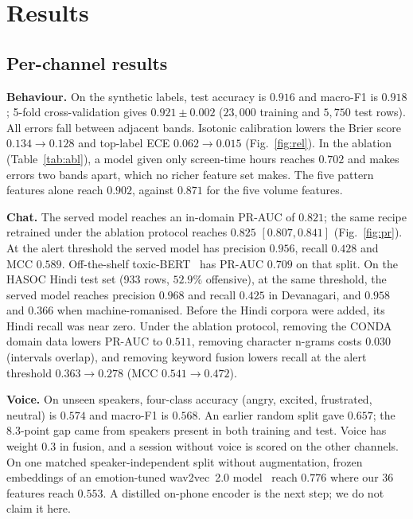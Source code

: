 \documentclass[conference]{IEEEtran}
\begin{document}
\section{Results}
\subsection{Per-channel results}
\textbf{Behaviour.} On the synthetic labels, test accuracy is $0.916$ and macro-F1 is
$0.918$; 5-fold cross-validation gives $0.921\pm0.002$ ($23{,}000$ training and
$5{,}750$ test rows). All errors fall between adjacent bands. Isotonic calibration
lowers the Brier score $0.134\!\rightarrow\!0.128$ and top-label ECE
$0.062\!\rightarrow\!0.015$ (Fig.~\ref{fig:rel}). In the ablation
(Table~\ref{tab:abl}), a model given only screen-time hours reaches $0.702$ and makes
errors two bands apart, which no richer feature set makes. The five pattern features
alone reach $0.902$, against $0.871$ for the five volume features.

\textbf{Chat.} The served model reaches an in-domain PR-AUC of $0.821$; the same recipe
retrained under the ablation protocol reaches $0.825$ $[0.807,0.841]$
(Fig.~\ref{fig:pr}). At the alert threshold the served model has precision $0.956$,
recall $0.428$ and MCC $0.589$. Off-the-shelf toxic-BERT~\cite{detoxify2020} has PR-AUC
$0.709$ on that split. On the HASOC Hindi test set (933 rows, $52.9\%$ offensive), at
the same threshold, the served model reaches precision $0.968$ and recall $0.425$ in
Devanagari, and $0.958$ and $0.366$ when machine-romanised. Before the Hindi corpora
were added, its Hindi recall was near zero. Under the ablation protocol, removing the
CONDA domain data lowers PR-AUC to $0.511$, removing character n-grams costs $0.030$
(intervals overlap), and removing keyword fusion lowers recall at the alert threshold
$0.363\!\rightarrow\!0.278$ (MCC $0.541\!\rightarrow\!0.472$).

\textbf{Voice.} On unseen speakers, four-class accuracy (angry, excited, frustrated,
neutral) is $0.574$ and macro-F1 is $0.568$. An earlier random split gave $0.657$; the
8.3-point gap came from speakers present in both training and test. Voice has weight
$0.3$ in fusion, and a session without voice is scored on the other channels. On one
matched speaker-independent split without augmentation, frozen embeddings of an
emotion-tuned wav2vec~2.0 model~\cite{wagner2023} reach $0.776$ where our 36 features
reach $0.553$. A distilled on-phone encoder is the next step; we do not claim it here.
\end{document}
